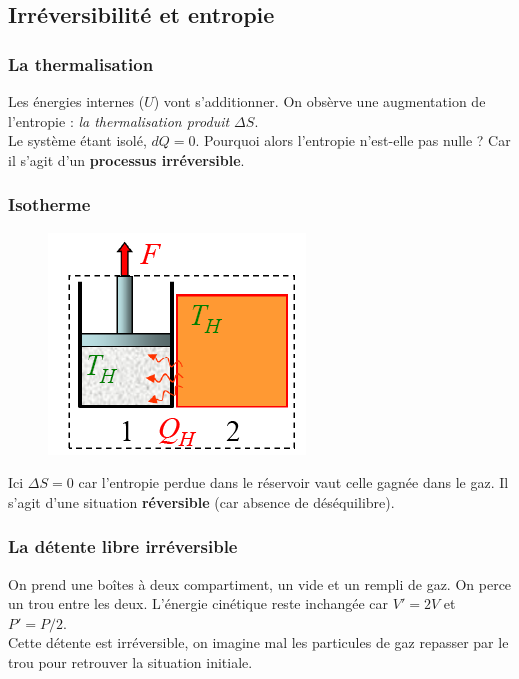 \documentclass	[11pt, a4paper, openany]{book}
\begin{document}
\subsection{Irréversibilité et entropie}
\subsubsection{La thermalisation}
Les énergies internes ($U$) vont s'additionner. On obsèrve une augmentation de l'entropie : \textit{la thermalisation produit $\Delta S$}.\\
Le système étant isolé, $dQ = 0$. Pourquoi alors l'entropie n'est-elle pas nulle ? Car il s'agit d'un \textbf{processus irréversible}.
\newpage
\subsubsection{Isotherme}
\begin{figure}
\includegraphics[scale=0.44]{th/image20.png}
\end{figure}
Ici $\Delta S = 0$ car l'entropie perdue dans le réservoir vaut celle gagnée dans le gaz. Il s'agit d'une situation \textbf{réversible} (car absence de déséquilibre).

\subsubsection{La détente libre irréversible}
On prend une boîtes à deux compartiment, un vide et un rempli de gaz. On perce un trou entre les deux. L'énergie cinétique reste inchangée car $V' = 2V$ et $P' = P/2$. \\
Cette détente est irréversible, on imagine mal les particules de gaz repasser par le trou pour retrouver la situation initiale.\\
\end{document}
